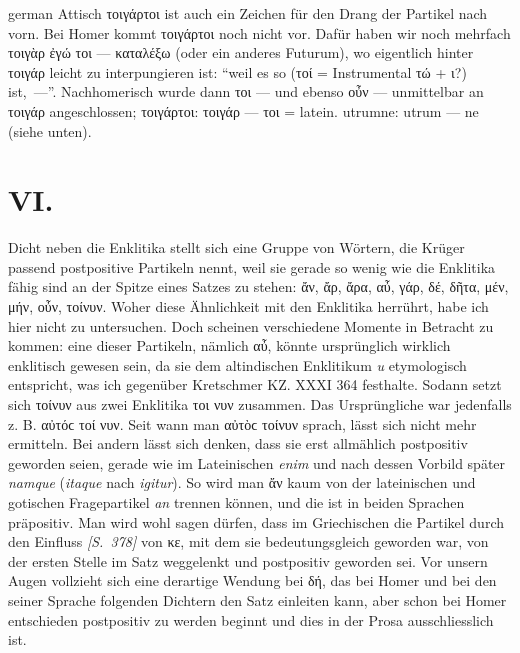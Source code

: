 \begin{otherlanguage*}{german}
Attisch τοιγάρτοι ist auch ein Zeichen für den Drang der Partikel nach vorn. Bei Homer kommt τοιγάρτοι noch nicht vor. Dafür haben wir noch mehrfach τοιγὰρ ἐγώ τοι — καταλέξω (oder ein anderes Futurum), wo eigentlich hinter τοιγάρ leicht zu interpungieren ist: “weil es so (τοί = Instrumental τώ + ι?) ist,~\mbox{—”.} Nachhomerisch wurde dann τοι — und ebenso οὖν — unmittelbar an τοιγάρ angeschlossen; τοιγάρτοι: τοιγάρ — τοι = latein. utrumne: utrum — ne (siehe unten).

\section*{VI.}

Dicht neben die Enklitika stellt sich eine Gruppe von Wörtern, die Krüger passend postpositive Partikeln nennt, weil sie gerade so wenig wie die Enklitika fähig sind an der Spitze eines Satzes zu stehen: ἄν, ἄρ, ἄρα, αὖ, γάρ, δέ, δῆτα, μέν, μήν, οὖν, τοίνυν. Woher diese Ähnlichkeit mit den Enklitika herrührt, habe ich hier nicht zu untersuchen. Doch scheinen verschiedene Momente in Betracht zu kommen: eine dieser Partikeln, nämlich αὖ, könnte ursprünglich wirklich enklitisch gewesen sein, da sie dem altindischen Enklitikum \emph{u} etymologisch entspricht, was ich gegenüber Kretschmer KZ. XXXI 364 festhalte. Sodann setzt sich τοίνυν aus zwei Enklitika τοι νυν zusammen. Das Ursprüngliche war jedenfalls z. B. αὐτόϲ τοί νυν. Seit wann man αὐτὸϲ τοίνυν sprach, lässt sich nicht mehr ermitteln. Bei andern lässt sich denken, dass sie erst allmählich postpositiv geworden seien, gerade wie im Lateinischen \emph{enim} und nach dessen Vorbild später \emph{namque} (\emph{itaque} nach \emph{igitur}). So wird man ἄν kaum von der lateinischen und gotischen Fragepartikel \emph{an} trennen können, und die ist in beiden Sprachen präpositiv. Man wird wohl sagen dürfen, dass im Griechischen die Partikel durch den Einfluss \hypertarget{p378}{\emph{[S.~378]}}\label{p378} von κε, mit dem sie bedeutungsgleich geworden war, von der ers\-ten Stelle im Satz weggelenkt und postpositiv geworden sei. Vor unsern Augen vollzieht sich eine derartige Wendung bei δή, das bei Homer und bei den seiner Sprache folgenden Dichtern den Satz einleiten kann, aber schon bei Homer entschieden postpositiv zu werden beginnt und dies in der Prosa ausschliesslich ist.


\end{otherlanguage*}
